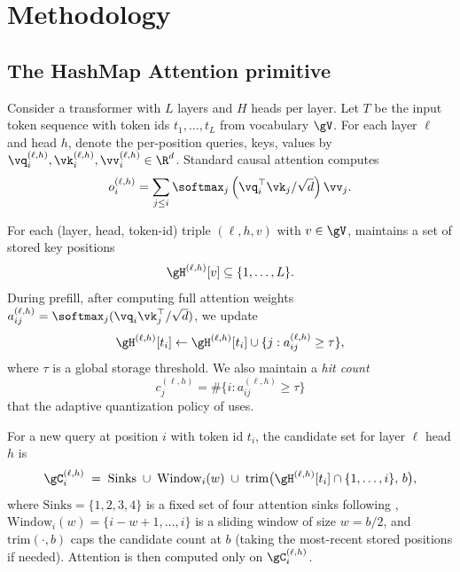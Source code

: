 \section{Methodology}
\label{sec:method}

\subsection{The HashMap Attention primitive}
\label{sec:method:hma}

 Consider a transformer with $L$ layers and $H$ heads per layer. Let $T$ be the input token sequence with token ids $t_1, \dots, t_L$ from vocabulary $\gV$. For each layer $\ell$ and head $h$, denote the per-position queries, keys, values by $\vq_i^{(\ell, h)}, \vk_i^{(\ell, h)}, \vv_i^{(\ell, h)} \in \R^{d}$. Standard causal attention computes
\begin{equation}
o_i^{(\ell, h)} = \sum_{j \leq i} \softmax_j\left( \vq_i^\top \vk_j / \sqrt{d} \right) \vv_j .
\end{equation}

 For each (layer, head, token-id) triple $(\ell, h, v)$ with $v \in \gV$, \hma maintains a set of stored key positions
\begin{equation}
\gH^{(\ell, h)}[v] \subseteq \{1, \dots, L\}.
\end{equation}
During prefill, after computing full attention weights $a_{ij}^{(\ell, h)} = \softmax_j(\vq_i \vk_j^\top / \sqrt{d})$, we update
\begin{equation}
\gH^{(\ell, h)}[t_i] \leftarrow \gH^{(\ell, h)}[t_i] \cup \{j : a_{ij}^{(\ell, h)} \geq \tau \},
\end{equation}
where $\tau$ is a global storage threshold. We also maintain a \emph{hit count}
\begin{equation}
c_j^{(\ell, h)} = \#\{ i : a_{ij}^{(\ell, h)} \geq \tau \}
\end{equation}
that the adaptive quantization policy of  uses.

 For a new query at position $i$ with token id $t_i$, the \hma candidate set for layer $\ell$ head $h$ is
\begin{equation}
\gC_i^{(\ell, h)} \;=\; \mathrm{Sinks} \;\cup\; \mathrm{Window}_i(w) \;\cup\; \mathrm{trim}\big(\gH^{(\ell, h)}[t_i] \cap \{1, \dots, i\},\, b\big),
\end{equation}
where $\mathrm{Sinks} = \{1, 2, 3, 4\}$ is a fixed set of four attention sinks following \streaming, $\mathrm{Window}_i(w) = \{i - w + 1, \dots, i\}$ is a sliding window of size $w = b/2$, and $\mathrm{trim}(\cdot, b)$ caps the candidate count at $b$ (taking the most-recent stored positions if needed). Attention is then computed only on $\gC_i^{(\ell, h)}$.

